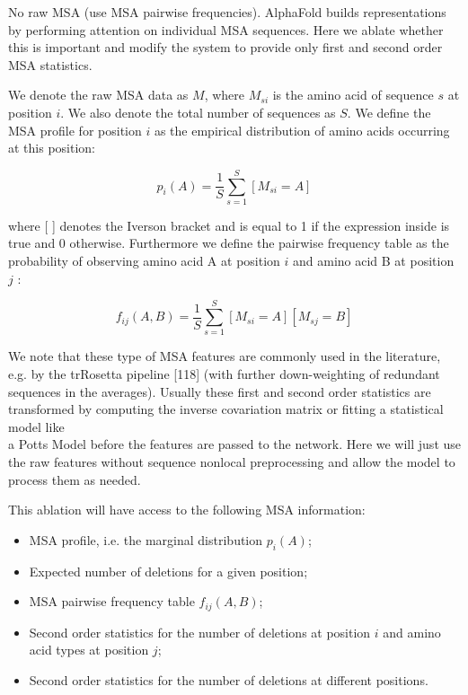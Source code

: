 \documentclass[10pt]{article}
\begin{document}
No raw MSA (use MSA pairwise frequencies). AlphaFold builds representations by performing attention on individual MSA sequences. Here we ablate whether this is important and modify the system to provide only first and second order MSA statistics.

We denote the raw MSA data as $M$, where $M_{s i}$ is the amino acid of sequence $s$ at position $i$. We also denote the total number of sequences as $S$. We define the MSA profile for position $i$ as the empirical distribution of amino acids occurring at this position:


\begin{equation*}
p_{i}(A)=\frac{1}{S} \sum_{s=1}^{S}\left[M_{s i}=A\right] \tag{53}
\end{equation*}


where [ ] denotes the Iverson bracket and is equal to 1 if the expression inside is true and 0 otherwise. Furthermore we define the pairwise frequency table as the probability of observing amino acid A at position $i$ and amino acid B at position $j$ :


\begin{equation*}
f_{i j}(A, B)=\frac{1}{S} \sum_{s=1}^{S}\left[M_{s i}=A\right]\left[M_{s j}=B\right] \tag{54}
\end{equation*}


We note that these type of MSA features are commonly used in the literature, e.g. by the trRosetta pipeline [118] (with further down-weighting of redundant sequences in the averages). Usually these first and second order statistics are transformed by computing the inverse covariation matrix or fitting a statistical model like\\
a Potts Model before the features are passed to the network. Here we will just use the raw features without sequence nonlocal preprocessing and allow the model to process them as needed.

This ablation will have access to the following MSA information:

\begin{itemize}
  \item MSA profile, i.e. the marginal distribution $p_{i}(A)$;
  \item Expected number of deletions for a given position;
  \item MSA pairwise frequency table $f_{i j}(A, B)$;
  \item Second order statistics for the number of deletions at position $i$ and amino acid types at position $j$;
  \item Second order statistics for the number of deletions at different positions.
\end{itemize}
\end{document}
